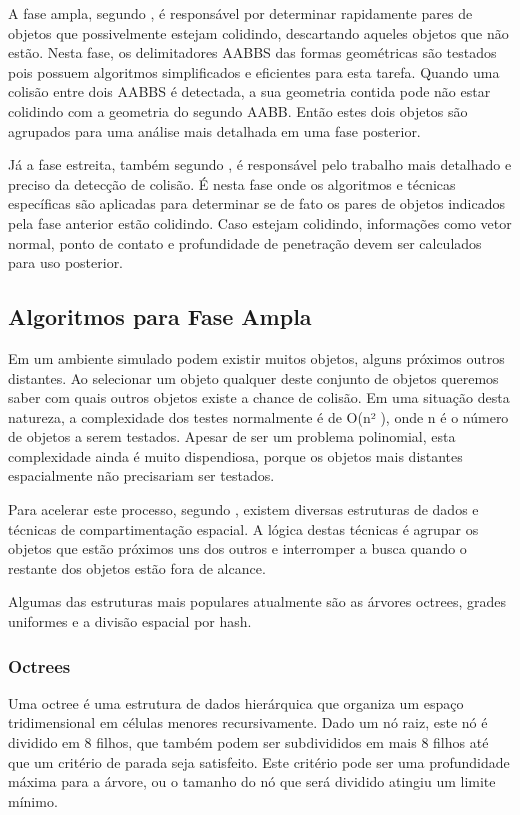 A fase ampla, segundo , é responsável por determinar rapidamente pares de objetos que possivelmente estejam colidindo, descartando aqueles objetos que não estão.
Nesta fase, os delimitadores AABBS das formas geométricas são testados pois possuem algoritmos simplificados e eficientes para esta tarefa.
Quando uma colisão entre dois AABBS é detectada, a sua geometria contida pode não estar colidindo com a geometria do segundo AABB. Então estes dois objetos são agrupados para uma análise mais detalhada em uma fase posterior.

Já a fase estreita, também segundo ,  é responsável pelo trabalho mais detalhado e preciso da detecção de colisão.
É nesta fase onde os algoritmos e técnicas específicas são aplicadas para determinar se de fato os pares de objetos indicados pela fase anterior estão colidindo.
Caso estejam colidindo, informações como vetor normal, ponto de contato e profundidade de penetração devem ser calculados para uso posterior.

\subsection{Algoritmos para Fase Ampla}
Em um ambiente simulado podem existir muitos objetos, alguns próximos outros distantes. 
Ao selecionar um objeto qualquer deste conjunto de objetos queremos saber com quais outros objetos existe a chance de colisão. 
Em uma situação desta natureza, a complexidade dos testes normalmente é de O(n² ), onde n é o número de objetos a serem
testados. Apesar de ser um problema polinomial, esta complexidade ainda é muito dispendiosa, porque os objetos mais distantes espacialmente não precisariam ser testados.

Para acelerar este processo, segundo , existem diversas estruturas de dados e técnicas de compartimentação espacial. 
A lógica destas técnicas é agrupar os objetos que estão próximos uns dos outros e interromper a busca quando o restante dos objetos estão fora de alcance.

Algumas das estruturas mais populares atualmente são as árvores octrees, grades uniformes e a divisão espacial por hash.

\subsubsection{Octrees}

Uma octree é uma estrutura de dados hierárquica que organiza um espaço
tridimensional em células menores recursivamente.
Dado um nó raiz, este nó é dividido em 8  filhos, que também podem ser
subdivididos em mais 8 filhos até que um critério de parada seja satisfeito.
Este critério pode ser uma profundidade máxima para a árvore, ou o tamanho do
nó que será dividido atingiu um limite mínimo.

